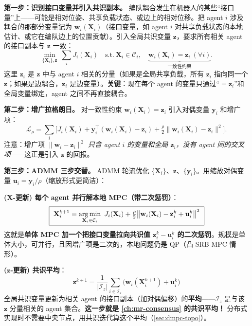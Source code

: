 \textbf{第一步：识别接口变量并引入共识副本。} 编队耦合发生在机器人的某些“接口量”上——可能是相对位姿、共享负载状态、或边上的相对位移。把 agent $i$ 涉及耦合的那部分变量记为 $\mathbf{w}_i(\mathbf{X}_i)$（接口变量，如 agent $i$ 对共享负载状态的本地估计、或它在编队边上的位置贡献）。引入全局共识变量 $\mathbf{z}$，要求所有相关 agent 的接口副本与 $\mathbf{z}$ 一致：
\begin{equation}
  \min_{\{\mathbf{X}_i\},\mathbf{z}}\ \sum_i J_i(\mathbf{X}_i)\quad\text{s.t.}\ \mathbf{X}_i\in\mathcal{C}_i,\quad \underbrace{\mathbf{w}_i(\mathbf{X}_i)=\mathbf{z}_i\ (\forall i)}_{\text{一致性约束}}.
  \label{eq:dmpc-consensus-form}
\end{equation}
这里 $\mathbf{z}_i$ 是 $\mathbf{z}$ 中与 agent $i$ 相关的分量（如果是全局共享负载，所有 $\mathbf{z}_i$ 指向同一个 $\mathbf{z}$；如果是边耦合，$\mathbf{z}_i$ 是边变量）。\textbf{关键}：现在每个 agent 的变量只通过“$=\mathbf{z}_i$”和全局变量绑定，agent 之间不再直接耦合。

\textbf{第二步：增广拉格朗日。} 对一致性约束 $\mathbf{w}_i(\mathbf{X}_i)=\mathbf{z}_i$ 引入对偶变量 $\mathbf{y}_i$ 和增广项：
\begin{equation}
  \mathcal{L}_\rho = \sum_i\Big[J_i(\mathbf{X}_i) + \mathbf{y}_i^\top(\mathbf{w}_i(\mathbf{X}_i)-\mathbf{z}_i) + \tfrac{\rho}{2}\|\mathbf{w}_i(\mathbf{X}_i)-\mathbf{z}_i\|^2\Big].
  \label{eq:dmpc-aug-lag}
\end{equation}
注意：增广项 $\|\mathbf{w}_i-\mathbf{z}_i\|^2$ \emph{只含 agent $i$ 的变量和全局 $\mathbf{z}_i$，没有 agent 间的交叉项}——这正是引入 $\mathbf{z}$ 的回报。

\textbf{第三步：ADMM 三步交替。} ADMM 轮流优化 $\{\mathbf{X}_i\}$、$\mathbf{z}$、$\{\mathbf{y}_i\}$。用缩放对偶变量 $\mathbf{u}_i=\mathbf{y}_i/\rho$（缩放形式更简洁）：

\textbf{($\mathbf{X}$-更新) 每个 agent 并行解本地 MPC（带二次惩罚）}：
\begin{equation}
  \boxed{\ \mathbf{X}_i^{k+1}=\argminop_{\mathbf{X}_i\in\mathcal{C}_i}\ J_i(\mathbf{X}_i)+\tfrac{\rho}{2}\big\|\mathbf{w}_i(\mathbf{X}_i)-\mathbf{z}_i^k+\mathbf{u}_i^k\big\|^2\ }
  \label{eq:dmpc-x-update}
\end{equation}
这就是\textbf{单体 MPC 加一个把接口变量拉向共识值 $\mathbf{z}_i^k-\mathbf{u}_i^k$ 的二次惩罚}。规模是单体大小，可并行，且因增广项是二次的，本地问题仍是 QP（凸 SRB MPC 情形）。

\textbf{($\mathbf{z}$-更新) 共识平均}：
\begin{equation}
  \boxed{\ \mathbf{z}^{k+1}=\frac{1}{|\mathcal{I}_z|}\sum_{i\in\mathcal{I}_z}\big(\mathbf{w}_i(\mathbf{X}_i^{k+1})+\mathbf{u}_i^k\big)\ }
  \label{eq:dmpc-z-update}
\end{equation}
全局共识变量更新为相关 agent 的接口副本（加对偶偏移）的\textbf{平均}——$\mathcal{I}_z$ 是与该 $\mathbf{z}$ 分量相关的 agent 集合。\textbf{这一步就是 \cref{ch:mr-consensus} 的共识平均！} 分布式实现时不需要中央节点，用共识迭代算这个平均（\cref{sec:dmpc-topo}）。

